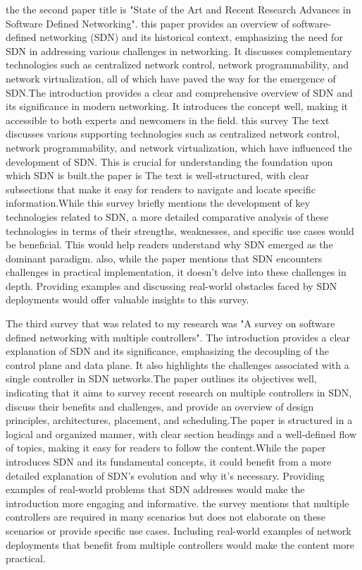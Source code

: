 \documentclass{article}
\begin{document}
\begin{tex}
the the second paper title is "State of the Art and Recent Research Advances in Software Defined Networking"\cite{bakhshi2017state}. this paper provides an overview of software-defined networking (SDN) and its historical context, emphasizing the need for SDN in addressing various challenges in networking. It discusses complementary technologies such as centralized network control, network programmability, and network virtualization, all of which have paved the way for the emergence of SDN.The introduction provides a clear and comprehensive overview of SDN and its significance in modern networking. It introduces the concept well, making it accessible to both experts and newcomers in the field. this survey The text discusses various supporting technologies such as centralized network control, network programmability, and network virtualization, which have influenced the development of SDN. This is crucial for understanding the foundation upon which SDN is built.the paper is The text is well-structured, with clear subsections that make it easy for readers to navigate and locate specific information.While this survey  briefly mentions the development of key technologies related to SDN, a more detailed comparative analysis of these technologies in terms of their strengths, weaknesses, and specific use cases would be beneficial. This would help readers understand why SDN emerged as the dominant paradigm. also, while the paper mentions that SDN encounters challenges in practical implementation, it doesn't delve into these challenges in depth. Providing examples and discussing real-world obstacles faced by SDN deployments would offer valuable insights to this survey. 

The third survey that was related to my research was "A survey on software defined networking with multiple controllers"\cite{zhang2018survey}. The introduction provides a clear explanation of SDN and its significance, emphasizing the decoupling of the control plane and data plane. It also highlights the challenges associated with a single controller in SDN networks.The paper outlines its objectives well, indicating that it aims to survey recent research on multiple controllers in SDN, discuss their benefits and challenges, and provide an overview of design principles, architectures, placement, and scheduling.The paper is structured in a logical and organized manner, with clear section headings and a well-defined flow of topics, making it easy for readers to follow the content.While the paper introduces SDN and its fundamental concepts, it could benefit from a more detailed explanation of SDN's evolution and why it's necessary. Providing examples of real-world problems that SDN addresses would make the introduction more engaging and informative. the survey mentions that multiple controllers are required in many scenarios but does not elaborate on these scenarios or provide specific use cases. Including real-world examples of network deployments that benefit from multiple controllers would make the content more practical.


\end{tex}
\end{document}
